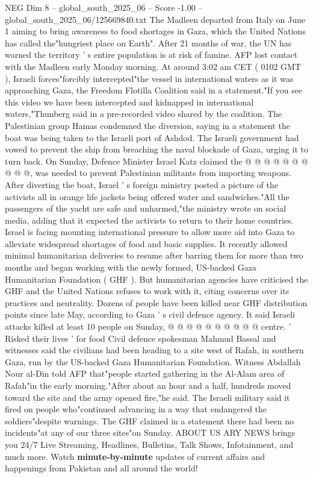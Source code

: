 \begin{textsample}{NEG Dim 8 – global\_south\_2025\_06 – Score -1.00 – global\_south\_2025\_06/125669840.txt}  \label{ex:f8_neg_250}
The Madleen departed from Italy on June 1 aiming to bring awareness to food shortages in Gaza, which the United Nations has called the"hungriest place on Earth".
After 21 months of war, the UN has warned the territory ' s entire population is at risk of famine.
AFP lost contact with the Madleen early Monday morning.
At around 3:02 am CET ( 0102 GMT ), Israeli forces"forcibly intercepted"the vessel in international waters as it was approaching Gaza, the Freedom Flotilla Coalition said in a statement."If you see this video we have been intercepted and kidnapped in international waters,"Thunberg said in a pre-recorded video shared by the coalition.
The Palestinian group Hamas condemned the diversion, saying in a statement the boat was being taken to the Israeli port of Ashdod.
The Israeli government had vowed to prevent the ship from breaching the naval blockade of Gaza, urging it to turn back.
On Sunday, Defence Minister Israel Katz claimed the @ @ @ @ @ @ @ @ @ @, was needed to prevent Palestinian militants from importing weapons.
After diverting the boat, Israel ' s foreign ministry posted a picture of the activists all in orange life jackets being offered water and sandwiches."All the passengers of the yacht are safe and unharmed,"the ministry wrote on social media, adding that it expected the activists to return to their home countries.
Israel is facing mounting international pressure to allow more aid into Gaza to alleviate widespread shortages of food and basic supplies.
It recently allowed minimal humanitarian deliveries to resume after barring them for more than two months and began working with the newly formed, US-backed Gaza Humanitarian Foundation ( GHF ).
But humanitarian agencies have criticised the GHF and the United Nations refuses to work with it, citing concerns over its practices and neutrality.
Dozens of people have been killed near GHF distribution points since late May, according to Gaza ' s civil defence agency.
It said Israeli attacks killed at least 10 people on Sunday, @ @ @ @ @ @ @ @ @ @ centre. ' Risked their lives ' for food Civil defence spokesman Mahmud Bassal and witnesses said the civilians had been heading to a site west of Rafah, in southern Gaza, run by the US-backed Gaza Humanitarian Foundation.
Witness Abdallah Nour al-Din told AFP that"people started gathering in the Al-Alam area of Rafah"in the early morning."After about an hour and a half, hundreds moved toward the site and the army opened fire,"he said.
The Israeli military said it fired on people who"continued advancing in a way that endangered the soldiers"despite warnings.
The GHF claimed in a statement there had been no incidents"at any of our three sites"on Sunday.
ABOUT US ARY NEWS brings you 24/7 Live Streaming, Headlines, Bulletins, Talk Shows, Infotainment, and much more.
Watch \textbf{minute-by-minute} updates of current affairs and happenings from Pakistan and all around the world!

\end{textsample}
